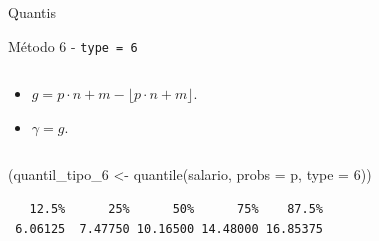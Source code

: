 \documentclass[
  10pt,
  ignorenonframetext,
]{beamer}
\newenvironment{Shaded}{\begin{snugshade}}{\end{snugshade}}
\newcommand{\AttributeTok}[1]{\textcolor[rgb]{0.40,0.45,0.13}{#1}}
\newcommand{\DecValTok}[1]{\textcolor[rgb]{0.68,0.00,0.00}{#1}}
\newcommand{\FunctionTok}[1]{\textcolor[rgb]{0.28,0.35,0.67}{#1}}
\newcommand{\NormalTok}[1]{\textcolor[rgb]{0.00,0.23,0.31}{#1}}
\newcommand{\OtherTok}[1]{\textcolor[rgb]{0.00,0.23,0.31}{#1}}
\providecommand{\tightlist}{%
  \setlength{\itemsep}{0pt}\setlength{\parskip}{0pt}}\usepackage{longtable,booktabs,array}
\begin{document}
\begin{frame}[fragile]{Quantis}
\begin{block}{Método 6 - \texttt{type\ =\ 6}}
\begin{columns}[T]
\begin{column}{0.5\textwidth}
\begin{itemize}
\tightlist
\item
  \(g = p\cdot n +m - \lfloor p\cdot n +m \rfloor\).
\item
  \(\gamma = g\).
\end{itemize}
\end{column}
\end{columns}

\begin{Shaded}
\begin{Highlighting}[]
\NormalTok{(quantil\_tipo\_6 }\OtherTok{\textless{}{-}} \FunctionTok{quantile}\NormalTok{(salario, }\AttributeTok{probs =}\NormalTok{ p, }\AttributeTok{type =} \DecValTok{6}\NormalTok{))}
\end{Highlighting}
\end{Shaded}

\begin{verbatim}
   12.5%      25%      50%      75%    87.5% 
 6.06125  7.47750 10.16500 14.48000 16.85375 
\end{verbatim}
\end{block}
\end{frame}
\end{document}
